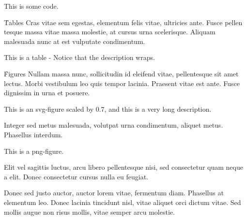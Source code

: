 \documentclass{article}
\begin{document}
    {This is some code.}

\h{Tables}
Cras vitae sem egestas, elementum felis vitae, ultricies ante. Fusce pellen tesque massa vitae massa molestie, at cursus urna scelerisque. Aliquam malesuada nunc at est vulputate condimentum.

    {This is a table - Notice that the description wraps.}

\h{Figures}
Nullam massa nunc, sollicitudin id eleifend vitae, pellentesque sit amet lectus. Morbi vestibulum leo quis tempor lacinia. Praesent vitae est ante. Fusce dignissim in urna et posuere.

    {This is an svg-figure scaled by 0.7, and this is a very long description.}

Integer sed metus malesuada, volutpat urna condimentum, aliquet metus. Phasellus interdum.

    {This is a png-figure.}

 Elit vel sagittis luctus, arcu libero pellentesque nisi, sed consectetur quam neque a elit. Donec consectetur cursus nulla eu feugiat.


Donec sed justo auctor, auctor lorem vitae, fermentum diam. Phasellus at elementum leo. Donec lacinia tincidunt nisl, vitae aliquet orci dictum vitae. Sed mollis augue non risus mollis, vitae semper arcu molestie.

\end{document}

